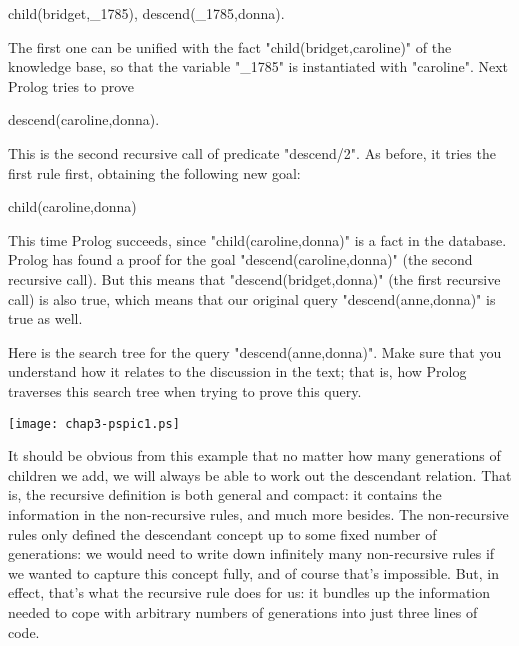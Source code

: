 \begin{LPNcodedisplay}
child(bridget,_1785),
descend(_1785,donna).
\end{LPNcodedisplay}


The first one can be unified with the fact
"child(bridget,caroline)" of the knowledge base, so that the
variable "\_1785" is instantiated with "caroline". Next Prolog
tries to prove

\begin{LPNcodedisplay}
descend(caroline,donna).
\end{LPNcodedisplay}
This is the second recursive call of predicate "descend/2".
As before, it tries the first rule first, obtaining the following new
goal:

\begin{LPNcodedisplay}
child(caroline,donna)
\end{LPNcodedisplay}


This time Prolog succeeds, since "child(caroline,donna)" is a
fact in the database. Prolog has found a proof for the goal
"descend(caroline,donna)" (the second recursive call). But this
means that "descend(bridget,donna)" (the first recursive call)
is also true, which means that our original query
"descend(anne,donna)" is true as well.

Here is the search tree for the query
"descend(anne,donna)". Make sure that you understand how it
relates to the discussion in the text; that is, how Prolog
traverses this search tree when trying to prove this query.

\begin{center}
\texttt{[image: chap3-pspic1.ps]}
\end{center}

\bigskip
\bigskip
\bigskip
\medskip

It should be obvious from this example that no matter how many
generations of children we add, we will always be able to work out the
descendant relation. That is, the recursive definition is both general
and compact: it contains  the information in the
non-recursive rules, and much more besides.  The non-recursive rules
only defined the descendant concept up to some fixed number of
generations: we would need to write down infinitely many non-recursive
rules if we wanted to capture this concept fully, and of course that's
impossible.  But, in effect, that's what the recursive rule does for
us: it bundles up the information needed to cope with arbitrary
numbers of generations into just three lines of code.

